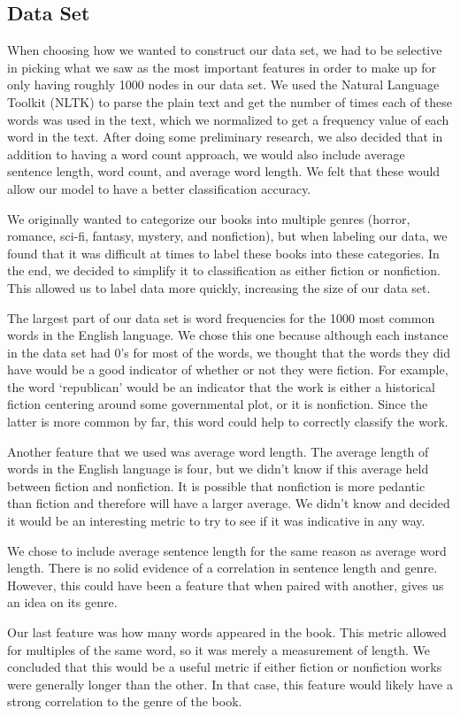 \documentclass{article}
\begin{document}
\subsection{Data Set}

When choosing how we wanted to construct our data set, we had to be selective in picking what we saw as the most important features in order to make up for only having roughly 1000 nodes in our data set. We used the Natural Language Toolkit (NLTK) to parse the plain text and get the number of times each of these words was used in the text, which we normalized to get a frequency value of each word in the text. After doing some preliminary research, we also decided that in addition to having a word count approach, we would also include average sentence length, word count, and average word length. We felt that these would allow our model to have a better classification accuracy.\par
We originally wanted to categorize our books into multiple genres (horror, romance, sci-fi, fantasy, mystery, and nonfiction), but when labeling our data, we found that it was difficult at times to label these books into these categories. In the end, we decided to simplify it to classification as either fiction or nonfiction. This allowed us to label data more quickly, increasing the size of our data set.\par
The largest part of our data set is word frequencies for the 1000 most common words in the English language. We chose this one because although each instance in the data set had 0’s for most of the words, we thought that the words they did have would be a good indicator of whether or not they were fiction. For example, the word ‘republican’ would be an indicator that the work is either a historical fiction centering around some governmental plot, or it is nonfiction. Since the latter is more common by far, this word could help to correctly classify the work. \par
Another feature that we used was average word length. The average length of words in the English language is four, but we didn’t know if this average held between fiction and nonfiction. It is possible that nonfiction is more pedantic than fiction and therefore will have a larger average. We didn’t know and decided it would be an interesting metric to try to see if it was indicative in any way.\par
We chose to include average sentence length for the same reason as average word length. There is no solid evidence of a correlation in sentence length and genre. However, this could have been a feature that when paired with another, gives us an idea on its genre.\par
Our last feature was how many words appeared in the book. This metric allowed for multiples of the same word, so it was merely a measurement of length. We concluded that this would be a useful metric if either fiction or nonfiction works were generally longer than the other. In that case, this feature would likely have a strong correlation to the genre of the book.
\end{document}
